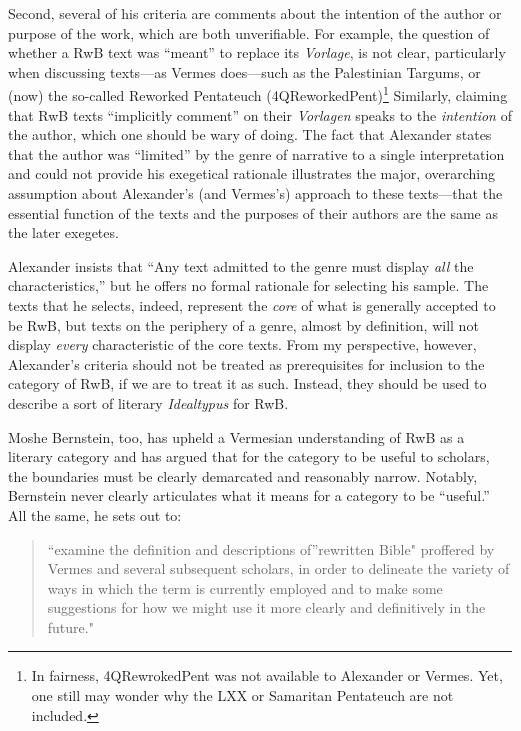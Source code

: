 Second, several of his criteria are comments about the intention of the
author or purpose of the work, which are both unverifiable. For example,
the question of whether a RwB text was ``meant'' to replace its
\emph{Vorlage}, is not clear, particularly when discussing texts---as
Vermes does---such as the Palestinian Targums, or (now) the so-called
Reworked Pentateuch (4QReworkedPent)\footnote{In fairness,
  4QRewrokedPent was not available to Alexander or Vermes. Yet, one
  still may wonder why the LXX or Samaritan Pentateuch are not included.}
Similarly, claiming that RwB texts ``implicitly comment'' on their
\emph{Vorlagen} speaks to the \emph{intention} of the author, which one
should be wary of doing. The fact that Alexander states that the author
was ``limited'' by the genre of narrative to a single interpretation and
could not provide his exegetical rationale illustrates the major,
overarching assumption about Alexander's (and Vermes's) approach to
these texts---that the essential function of the texts and the purposes
of their authors are the same as the later exegetes.

Alexander insists that ``Any text admitted to the genre must display
\emph{all} the characteristics,''\autocite[119 n.
11]{alexander_carson-williamson1988} but he offers no formal rationale
for selecting his sample. The texts that he selects, indeed, represent
the \emph{core} of what is generally accepted to be RwB, but texts on
the periphery of a genre, almost by definition, will not display
\emph{every} characteristic of the core texts. From my perspective,
however, Alexander's criteria should not be treated as prerequisites for
inclusion to the category of RwB, if we are to treat it as such.
Instead, they should be used to describe a sort of literary
\emph{Idealtypus} for RwB.

Moshe Bernstein, too, has upheld a Vermesian understanding of RwB as a
literary category and has argued that for the category to be useful to
scholars, the boundaries must be clearly demarcated and reasonably
narrow.\autocite{bernstein_textus2005} Notably, Bernstein never clearly
articulates what it means for a category to be ``useful.'' All the same,
he sets out to:

\begin{quote}
``examine the definition and descriptions of''rewritten Bible" proffered
by Vermes and several subsequent scholars, in order to delineate the
variety of ways in which the term is currently employed and to make some
suggestions for how we might use it more clearly and definitively in the
future." \autocite[171--172]{bernstein_textus2005}
\end{quote}

